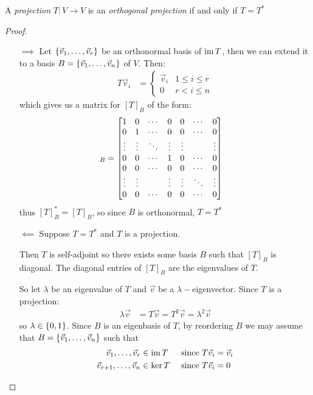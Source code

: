 \begin{theorem}
  A \emph{projection} $T : V \to V$ is an \emph{orthogonal projection} if and only if $T = T^*$
\end{theorem}
\begin{proof}
  \begin{itemize}
    \item[$\implies$] Let $\left\{\vec v_1,\ldots,\vec v_r\right\}$ be an orthonormal basis of $\operatorname{im} T$,
      then we can extend it to a basis $B = \left\{\vec v_1,\ldots,\vec v_n\right\}$ of $V$. Then:
        \begin{align}
          T\vec v_i &= \begin{cases}
            \vec v_i & 1 \le i \le r \\
            0 & r < i \le n
          \end{cases}
        \end{align}
      which gives us a matrix for $[T]_B$ of the form:
        \begin{align}
          [T]_B &= \bmatr{
            1 & 0 & \cdots & 0 & 0 & \cdots & 0 \\
            0 & 1 & \cdots & 0 & 0 & \cdots & 0 \\
            \vdots & \vdots & \ddots & \vdots & \vdots & & \vdots \\
            0 & 0 & \cdots & 1 & 0 & \cdots & 0 \\
            0 & 0 & \cdots & 0 & 0 & \cdots & 0 \\
            \vdots & \vdots &  & \vdots & \vdots & \ddots & \vdots \\
            0 & 0 & \cdots & 0 & 0 & \cdots & 0
          }
        \end{align}
      thus $[T]_B^* = [T]_B$, so since $B$ is orthonormal, $T = T^*$
    \item[$\impliedby$] Suppose $T = T^*$ and $T$ is a projection.

      Then $T$ is self-adjoint so there exists some basis $B$ such that $[T]_B$ is diagonal.
      The diagonal entries of $[T]_B$ are the eigenvalues of $T$.

      So let $\lambda$ be an eigenvalue of $T$ and $\vec v$ be a $\lambda-$eigenvector. Since $T$ is a projection:
        \begin{align}
          \lambda\vec v &= T\vec v = T^2\vec v = \lambda^2\vec v
        \end{align}
      so $\lambda \in \left\{0, 1\right\}$. Since $B$ is an eigenbasis of $T$, by reordering $B$ we may assume that
      $B = \left\{\vec v_1,\ldots,\vec v_n\right\}$ such that
        \begin{align}
          \vec v_1,\ldots,\vec v_r &\in \operatorname{im} T      & \text{ since } T\vec v_i &= \vec v_i \\
          \vec v_{r+1},\ldots,\vec v_n &\in \ker T & \text{ since } T\vec v_i &= 0
        \end{align}


\end{itemize}
\end{proof}
